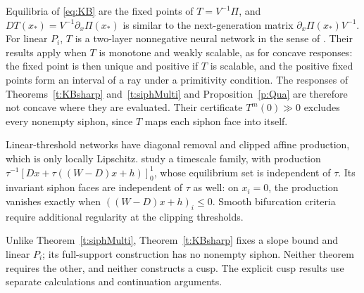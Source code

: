 \begin{enumerate}
Equilibria of \eqref{eq:KB} are the fixed points of $T=V^{-1}\Pi$, and $DT(x_*)=V^{-1}\partial_x\Pi(x_*)$ is similar to the
next-generation matrix $\partial_x\Pi(x_*)V^{-1}$. For linear $P_i$, $T$ is a two-layer nonnegative neural network in the sense of
\cite{piotrowski2024fixed}. Their results apply when $T$ is monotone and weakly scalable, as for concave responses: the fixed point
is then unique and positive if $T$ is scalable, and the positive fixed points form an interval of a ray under a primitivity
condition. The responses of Theorems~\ref{t:KBsharp} and~\ref{t:siphMulti} and Proposition~\ref{p:Qua} are therefore not concave
where they are evaluated. Their certificate $T^m(0)\gg0$ excludes every nonempty siphon, since $T$ maps each siphon face into itself.

Linear-threshold networks have diagonal removal and clipped affine production, which is only locally Lipschitz.
\cite{Retnaraj2026} study a timescale family, with production $\tau^{-1}[Dx+\tau((W-D)x+h)]_0^1$, whose equilibrium set is independent
of $\tau$. Its invariant siphon faces are independent of $\tau$ as well: on $x_i=0$, the production vanishes exactly when
$((W-D)x+h)_i\le0$. Smooth bifurcation criteria require additional regularity at the clipping thresholds.

Unlike Theorem~\ref{t:siphMulti}, Theorem~\ref{t:KBsharp} fixes a slope bound
and linear $P_i$; its full-support construction has no nonempty
siphon. Neither theorem requires the other, and neither constructs
a cusp. The explicit cusp results use separate calculations and
continuation arguments.


\end{enumerate}
